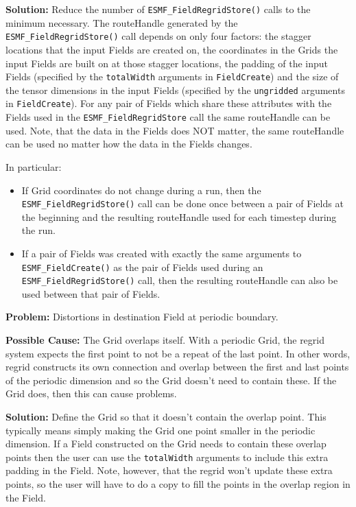  \smallskip

 {\bf Solution:} Reduce the number of {\tt ESMF\_FieldRegridStore()} calls to the minimum necessary. The
 routeHandle generated by the {\tt ESMF\_FieldRegridStore()} call depends on only four factors: the 
 stagger locations that the input Fields are created on, the coordinates in the Grids the input Fields
 are built on at those stagger locations, the padding of the input Fields 
 (specified by the {\tt totalWidth} arguments in {\tt FieldCreate}) and the size of the tensor
 dimensions in the input Fields (specified by the {\tt ungridded} arguments in {\tt FieldCreate}). 
 For any pair of Fields which share these attributes with the Fields used in the
 {\tt ESMF\_FieldRegridStore} call  the same routeHandle can be used. Note, that the data in the 
 Fields does NOT matter, the same routeHandle can be used no matter how the data in the Fields changes.

 \smallskip

 In particular:
 \begin{itemize}

 \item If Grid coordinates do not change during a run, then the {\tt ESMF\_FieldRegridStore()} call can be
 done once between a pair of Fields at the beginning and the resulting routeHandle used for each 
 timestep during the run. 

 \item If a pair of Fields was created with exactly the same arguments to {\tt ESMF\_FieldCreate()} as the 
 pair of Fields used during an {\tt ESMF\_FieldRegridStore()} call, then the resulting routeHandle can 
 also be used between that pair of Fields. 
 \end{itemize}

 \bigskip
 
 {\bf Problem:} Distortions in destination Field at periodic boundary.

 \medskip

 {\bf Possible Cause:} The Grid overlaps itself. With a periodic Grid, the regrid system expects
  the first point to not be a repeat of the last point. In other words,
  regrid constructs its own connection and overlap between the first and last points of the
  periodic dimension and so the Grid doesn't need to contain these. If the Grid does, then this
  can cause problems. 

 \smallskip

 {\bf Solution:} Define the Grid so that it doesn't contain the overlap point. This typically means simply making
 the Grid one point smaller in the periodic dimension.  If a Field 
 constructed on the Grid needs to contain these overlap points then the user can use the
 {\tt totalWidth} arguments to include this extra padding in the Field. Note, however, 
 that the regrid won't update these extra points, so the user will have to do a copy to fill the points
 in the overlap region in the Field.  

